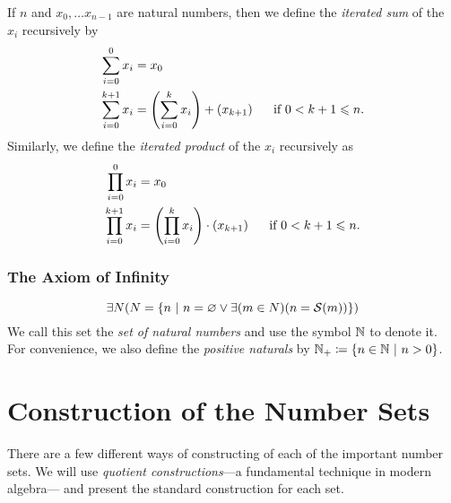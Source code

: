\begin{definition}
    If \(n\) and \(x_0, \dots x_{n - 1}\) are natural numbers,
    then we define the \emph{iterated sum} of the \(x_i\) recursively by
    \begin{align*}
        \sum_{i = 0}^{0}x_i &= x_0\\
        \sum_{i = 0}^{k + 1}x_i &= \pn*{\sum_{i = 0}^{k}x_i} + \pn*{x_{k + 1}}~~~~\text{ if } 0 < k + 1 \leq n.
    \end{align*}
\newpage
    Similarly, we define the \emph{iterated product} of the \(x_i\) recursively as
    \begin{align*}
        \prod_{i = 0}^{0}x_i &= x_0\\
        \prod_{i = 0}^{k + 1}x_i &= \pn*{\prod_{i = 0}^{k}x_i} \cdot \pn*{x_{k + 1}}~~~~\text{ if } 0 < k + 1 \leq n.
    \end{align*}
\end{definition}

\subsection{The Axiom of Infinity}
\begin{axiom}[Infinity]
    \vspace{-\abovedisplayskip}
    \[
        \exists N \pn*{N = \set*{n \suchthat n = \emptyset \join \exists\pn*{m \in N}\pn*{n = \successor{m}}}}
    \]
    We call this set the \emph{set of natural numbers} and use the symbol \(\mathbb{N}\) to denote it.
    For convenience,
    we also define the \emph{positive naturals} by \(\N_+ \defn \set*{n \in \N \suchthat n > 0}\).
\end{axiom}

\appendix
\chapter{Construction of the Number Sets}
There are a few different ways of constructing of each of the important number sets.
We will use \emph{quotient constructions}---a fundamental technique in modern algebra---%
and present the standard construction for each set.

